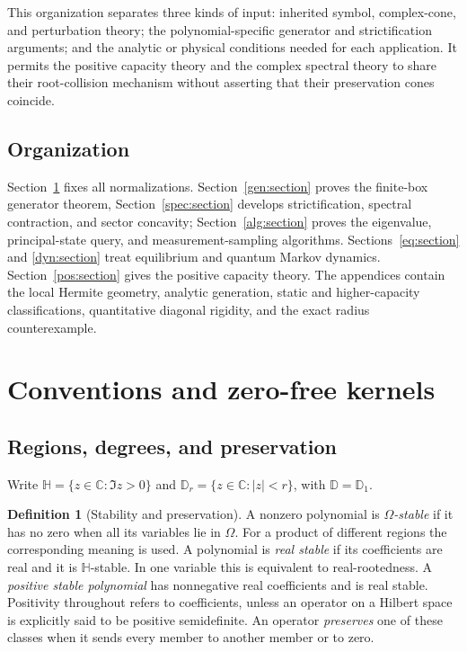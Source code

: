 \documentclass[reqno]{amsart}
\theoremstyle{definition}
\newtheorem{definition}[theorem]{Definition}
\theoremstyle{remark}
\newcommand{\C}{\mathbb C}
\newcommand{\D}{\mathbb D}
\newcommand{\HH}{\mathbb H}
\begin{document}
This organization separates three kinds of input: inherited symbol,
complex-cone, and perturbation theory; the polynomial-specific
generator and strictification arguments; and the analytic or physical
conditions needed for each application. It permits the positive
capacity theory and the complex spectral theory to share their
root-collision mechanism without asserting that their preservation
cones coincide.

\subsection{Organization}
Section~\ref{pre:section} fixes all normalizations.
Section~\ref{gen:section} proves the finite-box generator theorem,
Section~\ref{spec:section} develops strictification, spectral
contraction, and sector concavity; Section~\ref{alg:section} proves the eigenvalue,
principal-state query, and measurement-sampling algorithms.
Sections~\ref{eq:section} and \ref{dyn:section} treat equilibrium and
quantum Markov dynamics. Section~\ref{pos:section} gives the positive
capacity theory. The appendices contain the local Hermite geometry,
analytic generation, static and higher-capacity classifications,
quantitative diagonal rigidity, and the exact radius counterexample.


\section{Conventions and zero-free kernels}\label{pre:section}

\subsection{Regions, degrees, and preservation}
Write $\HH=\{z\in\C:\Im z>0\}$ and $\D_r=\{z\in\C:|z|<r\}$,
with $\D=\D_1$.
\begin{definition}[Stability and preservation]\label{pre:stability}
A nonzero polynomial is \emph{$\Omega$-stable} if it
has no zero when all its variables lie in $\Omega$.
For a product of different regions the corresponding meaning is used.
A polynomial is \emph{real stable} if its coefficients are real and it is
$\HH$-stable. In one variable this is equivalent to real-rootedness.
A \emph{positive stable polynomial} has nonnegative real coefficients and
is real stable. Positivity throughout refers to coefficients, unless an
operator on a Hilbert space is explicitly said to be positive semidefinite.
An operator \emph{preserves} one of these classes when it sends every
member to another member or to zero.
\end{definition}
\end{document}
